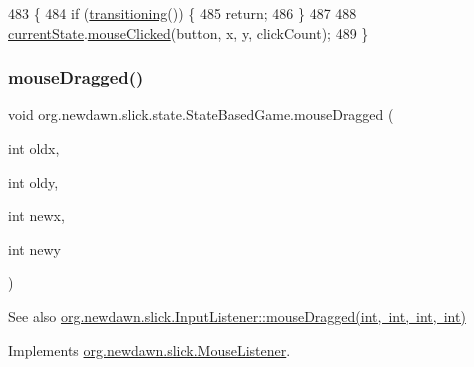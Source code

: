 \begin{DoxyCode}
483                                                                        \{
484         \textcolor{keywordflow}{if} (\mbox{\hyperlink{classorg_1_1newdawn_1_1slick_1_1state_1_1_state_based_game_ae869c08778875776081935a090d4c92f}{transitioning}}()) \{
485             \textcolor{keywordflow}{return};
486         \}
487         
488         \mbox{\hyperlink{classorg_1_1newdawn_1_1slick_1_1state_1_1_state_based_game_a6a45e68094bb9b7ec30b8a8b7d415766}{currentState}}.\mbox{\hyperlink{interfaceorg_1_1newdawn_1_1slick_1_1_mouse_listener_a3e42b74c252ecdc7418b0ee8bcae5510}{mouseClicked}}(button, x, y, clickCount);
489     \}
\end{DoxyCode}
\mbox{\label{classorg_1_1newdawn_1_1slick_1_1state_1_1_state_based_game_a7c9b5a16d368beda39b0024cc5d1fe29}} 
\subsubsection{\texorpdfstring{mouse\+Dragged()}{mouseDragged()}}
{\footnotesize\ttfamily void org.\+newdawn.\+slick.\+state.\+State\+Based\+Game.\+mouse\+Dragged (\begin{DoxyParamCaption}\item[{int}]{oldx,  }\item[{int}]{oldy,  }\item[{int}]{newx,  }\item[{int}]{newy }\end{DoxyParamCaption})\hspace{0.3cm}{\ttfamily [inline]}}

\begin{DoxySeeAlso}{See also}
\mbox{\hyperlink{interfaceorg_1_1newdawn_1_1slick_1_1_mouse_listener_a65022dd6acb492caa47dfd806b207139}{org.\+newdawn.\+slick.\+Input\+Listener\+::mouse\+Dragged(int, int, int, int)}} 
\end{DoxySeeAlso}


Implements \mbox{\hyperlink{interfaceorg_1_1newdawn_1_1slick_1_1_mouse_listener_a65022dd6acb492caa47dfd806b207139}{org.\+newdawn.\+slick.\+Mouse\+Listener}}.


